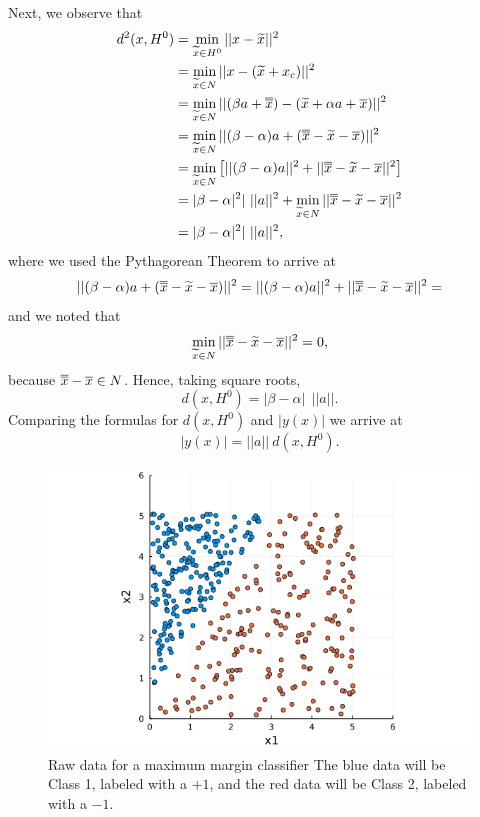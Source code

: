 Next, we observe that 
\begin{align*} 
    d^2(x, H^0) & = \min_{\widetilde{x} \in H^0} || x - \widetilde{x}||^2 \\
    & =  \min_{\widetilde{x} \in N} || x - (\widetilde{x} + x_c)||^2 \\
    & =  \min_{\widetilde{x} \in N} || (\beta a  + \doverline{x} ) - (\widetilde{x} + \alpha a + \overline{x})||^2 \\
    & =  \min_{\widetilde{x} \in N} || (\beta   - \alpha )a + (\doverline{x} - \widetilde{x} - \overline{x})||^2 \\
    & =  \min_{\widetilde{x} \in N} \left[ ||  (\beta  - \alpha)a||^2  + || \doverline{x} - \widetilde{x} - \overline{x}||^2 \right] \\
    & = |\beta  - \alpha|^2 | ~||a||^2 +  \min_{\widetilde{x} \in N} || \doverline{x} - \widetilde{x} - \overline{x}||^2 \\
    & = |\beta  - \alpha|^2 | ~||a||^2,
\end{align*}
where we used the Pythagorean Theorem to arrive at 
$$|| (\beta   - \alpha )a + (\doverline{x} - \widetilde{x} - \overline{x})||^2  =  ||  (\beta  - \alpha)a||^2  + || \doverline{x} - \widetilde{x} - \overline{x}||^2  = $$
and we noted that
$$  \min_{\widetilde{x} \in N} || \doverline{x} - \widetilde{x} - \overline{x}||^2 = 0,$$
because $\doverline{x} - \overline{x} \in N$. Hence, taking square roots, 
$$ d(x, H^0) = |\beta  - \alpha|~  ~||a||. $$
Comparing the formulas for $d(x, H^0)$ and $|y(x)|$ we arrive at 
$$ |y(x)| = ||a||~d(x, H^0).$$
\Qed

\begin{figure}[hb!]%
\centering
\includegraphics[width=0.95\columnwidth]{graphics/Chap13SeparatingHyperplanes/MaxMarginClassifierRawData.png}%
\caption[]{Raw data for a maximum margin classifier The blue data will be Class 1, labeled with a $+1$, and the red data will be Class 2, labeled with a $-1$. 
}    
\label{fig:max_margin_gt}
\end{figure}

